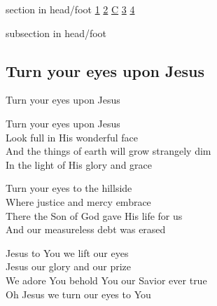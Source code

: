 \documentclass{beamer}
\begin{document}
{
{ 
 {
 \begin{beamercolorbox}[ht=4.5ex,dp=1.5ex,%
      leftskip=.3cm,rightskip=.3cm plus1fil]{section in head/foot}
 \fontsize{12}{25}\selectfont 
\hyperlink{Turn your eyes upon Jesus[]1}{1}
\hyperlink{Turn your eyes upon Jesus[]2}{2}
\hyperlink{Turn your eyes upon Jesus[]C}{C}
\hyperlink{Turn your eyes upon Jesus[]3}{3}
\hyperlink{Turn your eyes upon Jesus[]4}{4}
 
 \end{beamercolorbox}%
  \begin{beamercolorbox}[ht=2.5ex,dp=1.125ex,%
   leftskip=.3cm,rightskip=.3cm plus1fil]{subsection in head/foot}
   \insertauthor
 \end{beamercolorbox}%
 }
}
\subsection{ Turn your eyes upon Jesus }

\hypertarget{Turn your eyes upon Jesus[]1}{}
\begin{frame}{Turn your eyes upon Jesus }
\fontsize{ 15 }{ 19 }\selectfont

Turn your eyes upon Jesus\\ 
Look full in His wonderful face\\ 
And the things of earth will grow strangely dim\\ 
In the light of His glory and grace 

\end{frame}

\hypertarget{Turn your eyes upon Jesus[]2}{}
\begin{frame}{}
\fontsize{ 15 }{ 19 }\selectfont

Turn your eyes to the hillside\\ 
Where justice and mercy embrace\\ 
There the Son of God gave His life for us\\ 
And our measureless debt was erased 

\end{frame}

\hypertarget{Turn your eyes upon Jesus[]C}{}
\begin{frame}{}
\fontsize{ 15 }{ 19 }\selectfont

Jesus to You we lift our eyes\\ 
Jesus our glory and our prize\\ 
We adore You behold You our Savior ever true\\ 
Oh Jesus we turn our eyes to You 


\end{frame}}
\end{document}
